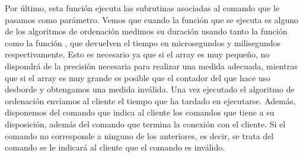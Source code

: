 
Por último, esta función ejecuta las subrutinas asociadas al comando que le pasamos como parámetro. Vemos que cuando la función que se ejecuta es alguno de los algoritmos de ordenación medimos su duración usando tanto la función  como la función , que devuelven el tiempo en microsegundos y milisegundos respectivamente. Esto es necesario ya que si el array es muy pequeño,  no dispondrá de la precisión necesaria para realizar una medida adecuada, mientras que si el array es muy grande es posible que el contador del que hace uso  desborde y obtengamos una medida inválida. Una vez ejecutado el algoritmo de ordenación envíamos al cliente el tiempo que ha tardado en ejecutarse. Además, disponemos del comando  que indica al cliente los comandos que tiene a su disposición, además del comando  que termina la conexión con el cliente. Si el comando no corresponde a ninguno de los anteriores, es decir, se trata del comando  se le indicará al cliente que el comando es inválido.
